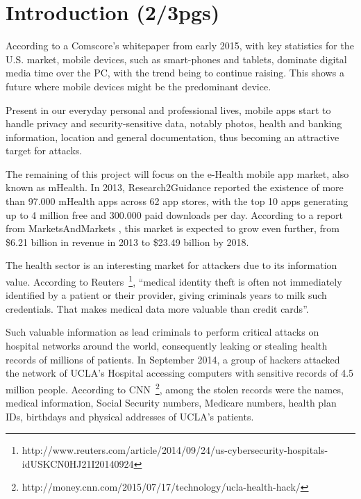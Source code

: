 
% 
% 

\section{Introduction (2/3pgs)}


According to a Comscore's whitepaper \cite{comscore} from early 2015, with key statistics for the U.S. market, mobile devices, such as smart-phones and tablets, dominate digital media time over the \ac{PC}, with the trend being to continue raising. This shows a future where mobile devices might be the predominant device.

Present in our everyday personal and professional lives, mobile \ac{apps} start to handle privacy and security-sensitive data, notably photos, health and banking information, location and general documentation, thus becoming an attractive target for attacks.

The remaining of this project will focus on the e-Health mobile \ac{app} market, also known as \ac{mHealth}. In 2013, Research2Guidance \cite{research2guidance} reported the existence of more than 97.000 \ac{mHealth} \ac{apps} across 62 app stores, with the top 10 \ac{apps} generating up to 4 million free and 300.000 paid downloads per day. According to a report from MarketsAndMarkets \cite{marketsandmarkets}, this market is expected to grow even further, from \$6.21 billion in revenue in 2013 to \$23.49 billion by 2018.

The health sector is an interesting market for attackers due to its information value. According to Reuters~\footnote{http://www.reuters.com/article/2014/09/24/us-cybersecurity-hospitals-idUSKCN0HJ21I20140924}, ``medical identity theft is often not immediately identified by a patient or their provider, giving criminals years to milk such credentials. That makes medical data more valuable than credit cards''.

Such valuable information as lead criminals to perform critical attacks on hospital networks around the world, consequently leaking or stealing health records of millions of patients. In September 2014, a group of hackers attacked the network of \ac{UCLA}'s Hospital accessing computers with sensitive records of 4.5 million people. According to \ac{CNN}~\footnote{http://money.cnn.com/2015/07/17/technology/ucla-health-hack/}, among the stolen records were the names, medical information, Social Security numbers, Medicare numbers, health plan IDs, birthdays and physical addresses of \ac{UCLA}'s patients.

